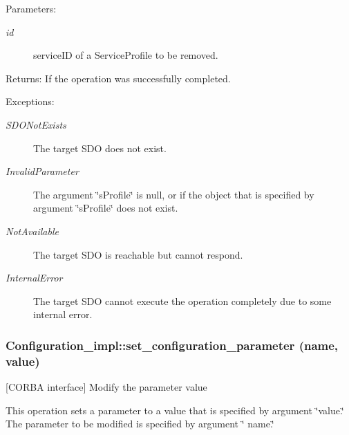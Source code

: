 \begin{Desc}
\item[Parameters:]
\begin{description}
\item[{\em id}]service\-ID of a Service\-Profile to be removed. \end{description}
\end{Desc}
\begin{Desc}
\item[Returns:]If the operation was successfully completed. \end{Desc}
\begin{Desc}
\item[Exceptions:]
\begin{description}
\item[{\em SDONot\-Exists}]The target SDO does not exist. \item[{\em Invalid\-Parameter}]The argument \char`\"{}s\-Profile\char`\"{} is null, or if the object that is specified by argument \char`\"{}s\-Profile\char`\"{} does not exist. \item[{\em Not\-Available}]The target SDO is reachable but cannot respond. \item[{\em Internal\-Error}]The target SDO cannot execute the operation completely due to some internal error.\end{description}
\end{Desc}
\subsubsection{\setlength{\rightskip}{0pt plus 5cm}Configuration\_\-impl::set\_\-configuration\_\-parameter (name, value)}\label{classConfiguration__impl_Configuration__impla9}


[CORBA interface] Modify the parameter value 

This operation sets a parameter to a value that is specified by argument \char`\"{}value.\char`\"{} The parameter to be modified is specified by argument \char`\"{} name.\char`\"{}

